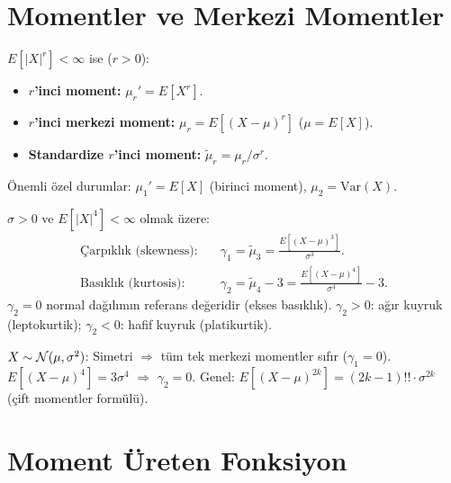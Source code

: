 \section{Momentler ve Merkezi Momentler}
\label{sec:momentler}

\begin{tanim}[Momentler]
\label{def:moment}
$E[|X|^r] < \infty$ ise ($r > 0$):
\begin{itemize}
  \item \textbf{$r$'inci moment:} $\mu_r' = E[X^r]$.
  \item \textbf{$r$'inci merkezi moment:} $\mu_r = E[(X-\mu)^r]$ ($\mu = E[X]$).
  \item \textbf{Standardize $r$'inci moment:} $\tilde{\mu}_r = \mu_r / \sigma^r$.
\end{itemize}
Önemli özel durumlar: $\mu_1' = E[X]$ (birinci moment), $\mu_2 = \mathrm{Var}(X)$.
\end{tanim}

\begin{tanim}
\label{def:carpiklik}
$\sigma > 0$ ve $E[|X|^4] < \infty$ olmak üzere:
\begin{align*}
  \text{Çarpıklık (skewness):} &\quad \gamma_1 = \tilde{\mu}_3 = \frac{E[(X-\mu)^3]}{\sigma^3}. \\
  \text{Basıklık (kurtosis):} &\quad \gamma_2 = \tilde{\mu}_4 - 3 = \frac{E[(X-\mu)^4]}{\sigma^4} - 3.
\end{align*}
$\gamma_2 = 0$ normal dağılımın referans değeridir (ekses basıklık).
$\gamma_2 > 0$: ağır kuyruk (leptokurtik); $\gamma_2 < 0$: hafif kuyruk (platikurtik).
\end{tanim}

\begin{ornek}
$X \sim \mathcal{N}(\mu, \sigma^2)$:
Simetri $\Rightarrow$ tüm tek merkezi momentler sıfır ($\gamma_1 = 0$).
$E[(X-\mu)^4] = 3\sigma^4$ $\Rightarrow$ $\gamma_2 = 0$.
Genel: $E[(X-\mu)^{2k}] = (2k-1)!! \cdot \sigma^{2k}$ (çift momentler formülü).
\end{ornek}

\section{Moment Üreten Fonksiyon}
\label{sec:muf}

